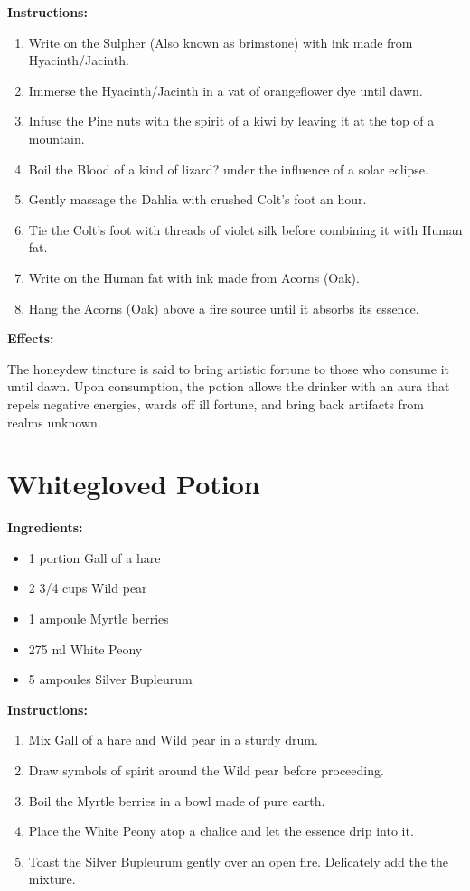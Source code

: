 \documentclass{article}
\begin{document}
\textbf{Instructions:}

\begin{enumerate}
  \item Write on the Sulpher (Also known as brimstone) with ink made from Hyacinth/Jacinth.
  \item Immerse the Hyacinth/Jacinth in a vat of orangeflower dye until dawn.
  \item Infuse the Pine nuts with the spirit of a kiwi by leaving it at the top of a mountain.
  \item Boil the Blood of a kind of lizard? under the influence of a solar eclipse.
  \item Gently massage the Dahlia with crushed Colt's foot an hour.
  \item Tie the Colt's foot with threads of violet silk before combining it with Human fat.
  \item Write on the Human fat with ink made from Acorns (Oak).
  \item Hang the Acorns (Oak) above a fire source until it absorbs its essence.
\end{enumerate}

\textbf{Effects:}

The honeydew tincture is said to bring artistic fortune to those who consume it until dawn. Upon consumption, the potion allows the drinker with an aura that repels negative energies, wards off ill fortune, and bring back artifacts from realms unknown.

\newpage
\section*{Whitegloved Potion}

\textbf{Ingredients:}

\begin{itemize}
  \item 1 portion Gall of a hare
  \item 2 3/4 cups Wild pear
  \item 1 ampoule Myrtle berries
  \item 275 ml White Peony
  \item 5 ampoules Silver Bupleurum
\end{itemize}

\textbf{Instructions:}

\begin{enumerate}
  \item Mix Gall of a hare and Wild pear in a sturdy drum.
  \item Draw symbols of spirit around the Wild pear before proceeding.
  \item Boil the Myrtle berries in a bowl made of pure earth.
  \item Place the White Peony atop a chalice and let the essence drip into it.
  \item Toast the Silver Bupleurum gently over an open fire. Delicately add the the mixture.
\end{enumerate}
\end{document}
